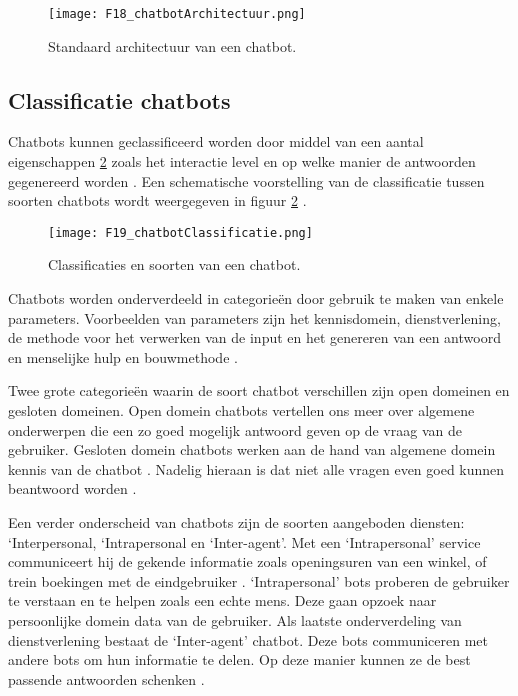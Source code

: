 \begin{figure}[h]
    \centering
    \texttt{[image: F18\_chatbotArchitectuur.png]}
    \captionsetup{justification=centering, singlelinecheck=false}    
    \caption{Standaard architectuur van een chatbot.}
    \label{fig:chatbotArchitectuur}
\end{figure}

\subsection{Classificatie chatbots}%
\label{sec:chatbotTypes}

Chatbots kunnen geclassificeerd worden door middel van een aantal eigenschappen \ref{fig:chatbotTypes} zoals het interactie level en op welke manier de antwoorden gegenereerd worden \autocite{Nimavat2017}.
Een schematische voorstelling van de classificatie tussen soorten chatbots wordt weergegeven in figuur \ref{fig:chatbotTypes} \autocite{Tamrakar2021}.


\begin{figure}[h]
    \centering
    \texttt{[image: F19\_chatbotClassificatie.png]}
    \captionsetup{justification=centering, singlelinecheck=false}   
    \caption{Classificaties en soorten van een chatbot.}
    \label{fig:chatbotTypes}
\end{figure}

Chatbots worden onderverdeeld in categorieën door gebruik te maken van enkele parameters. Voorbeelden van parameters zijn het kennisdomein, dienstverlening, de methode voor het verwerken van de input en het genereren van een antwoord en menselijke hulp en bouwmethode \autocite{Adamopoulou2020}. 

Twee grote categorieën waarin de soort chatbot verschillen zijn open domeinen en gesloten domeinen. Open domein chatbots vertellen ons meer over algemene onderwerpen die een zo goed mogelijk antwoord geven op de vraag van de gebruiker. Gesloten domein chatbots werken aan de hand van algemene domein kennis van de chatbot \autocite{Adamopoulou2020}. Nadelig hieraan is dat niet alle vragen even goed kunnen beantwoord worden \autocite{Kucherbaev2018}.

Een verder onderscheid van chatbots zijn de soorten aangeboden diensten: ‘Interpersonal, ‘Intrapersonal en ‘Inter-agent’. Met een ‘Intrapersonal’ service communiceert hij de gekende informatie zoals openingsuren van een winkel, of trein boekingen met de eindgebruiker \autocite{Adamopoulou2020}. ‘Intrapersonal’ bots proberen de gebruiker te verstaan en te helpen zoals een echte mens. Deze gaan opzoek naar persoonlijke domein data van de gebruiker. Als laatste onderverdeling van dienstverlening bestaat de ‘Inter-agent’ chatbot. Deze bots communiceren met andere bots om hun informatie te delen. Op deze manier kunnen ze de best passende antwoorden schenken \autocite{Nimavat2017}.

